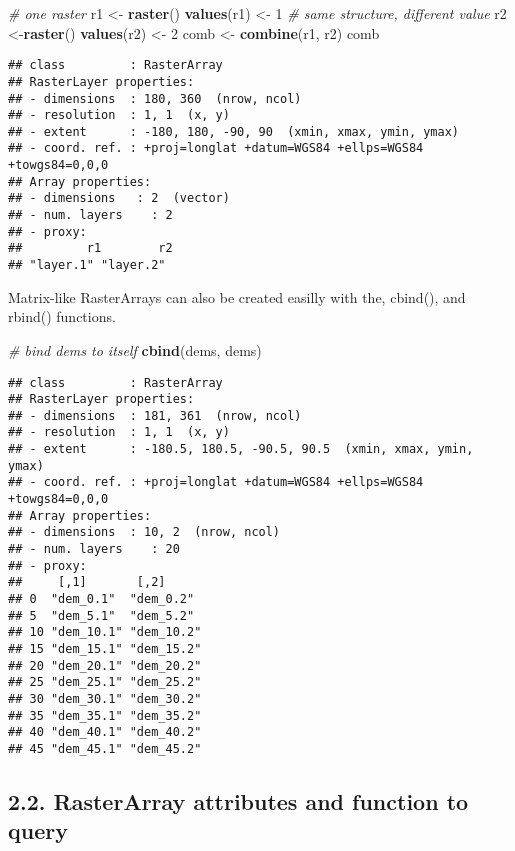 \documentclass[]{article}
\newenvironment{Shaded}{\begin{snugshade}}{\end{snugshade}}
\newcommand{\CommentTok}[1]{\textcolor[rgb]{0.56,0.35,0.01}{\textit{#1}}}
\newcommand{\DecValTok}[1]{\textcolor[rgb]{0.00,0.00,0.81}{#1}}
\newcommand{\KeywordTok}[1]{\textcolor[rgb]{0.13,0.29,0.53}{\textbf{#1}}}
\newcommand{\NormalTok}[1]{#1}
\newcommand{\StringTok}[1]{\textcolor[rgb]{0.31,0.60,0.02}{#1}}
\begin{document}
\begin{Shaded}
\begin{Highlighting}[]
\CommentTok{# one raster}
\NormalTok{r1 <-}\StringTok{ }\KeywordTok{raster}\NormalTok{()}
\KeywordTok{values}\NormalTok{(r1) <-}\StringTok{ }\DecValTok{1}
\CommentTok{# same structure, different value}
\NormalTok{r2 <-}\KeywordTok{raster}\NormalTok{()}
\KeywordTok{values}\NormalTok{(r2) <-}\StringTok{ }\DecValTok{2}
\NormalTok{comb <-}\StringTok{ }\KeywordTok{combine}\NormalTok{(r1, r2)}
\NormalTok{comb}
\end{Highlighting}
\end{Shaded}

\begin{verbatim}
## class         : RasterArray 
## RasterLayer properties: 
## - dimensions  : 180, 360  (nrow, ncol)
## - resolution  : 1, 1  (x, y)
## - extent      : -180, 180, -90, 90  (xmin, xmax, ymin, ymax)
## - coord. ref. : +proj=longlat +datum=WGS84 +ellps=WGS84 +towgs84=0,0,0 
## Array properties: 
## - dimensions   : 2  (vector)
## - num. layers    : 2
## - proxy:
##         r1        r2 
## "layer.1" "layer.2"
\end{verbatim}

Matrix-like RasterArrays can also be created easilly with the, cbind(),
and rbind() functions.

\begin{Shaded}
\begin{Highlighting}[]
\CommentTok{# bind dems to itself}
\KeywordTok{cbind}\NormalTok{(dems, dems)}
\end{Highlighting}
\end{Shaded}

\begin{verbatim}
## class         : RasterArray 
## RasterLayer properties: 
## - dimensions  : 181, 361  (nrow, ncol)
## - resolution  : 1, 1  (x, y)
## - extent      : -180.5, 180.5, -90.5, 90.5  (xmin, xmax, ymin, ymax)
## - coord. ref. : +proj=longlat +datum=WGS84 +ellps=WGS84 +towgs84=0,0,0 
## Array properties: 
## - dimensions  : 10, 2  (nrow, ncol)
## - num. layers    : 20
## - proxy:
##     [,1]       [,2]      
## 0  "dem_0.1"  "dem_0.2" 
## 5  "dem_5.1"  "dem_5.2" 
## 10 "dem_10.1" "dem_10.2"
## 15 "dem_15.1" "dem_15.2"
## 20 "dem_20.1" "dem_20.2"
## 25 "dem_25.1" "dem_25.2"
## 30 "dem_30.1" "dem_30.2"
## 35 "dem_35.1" "dem_35.2"
## 40 "dem_40.1" "dem_40.2"
## 45 "dem_45.1" "dem_45.2"
\end{verbatim}

\hypertarget{rasterarray-attributes-and-function-to-query}{%
\subsection{2.2. RasterArray attributes and function to
query}\label{rasterarray-attributes-and-function-to-query}}
\end{document}
